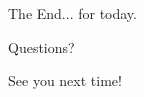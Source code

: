 \documentclass{beamer}
\begin{document}

\begin{frame}
\Huge{\centerline{The End... for today.}}
\Huge{\centerline{Questions?}}
\Huge{\centerline{See you next time!}}
\end{frame}

\end{document}
